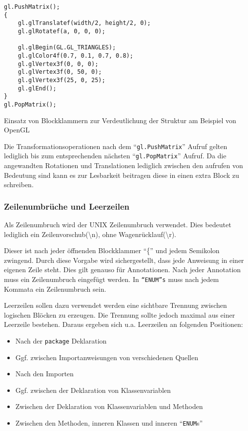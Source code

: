 \begin{listing}[H]
    \begin{verbatim}
gl.PushMatrix();
{
    gl.glTranslatef(width/2, height/2, 0); 
    gl.glRotatef(a, 0, 0, 0); 

    gl.glBegin(GL.GL_TRIANGLES); 
    gl.glColor4f(0.7, 0.1, 0.7, 0.8); 
    gl.glVertex3f(0, 0, 0); 
    gl.glVertex3f(0, 50, 0); 
    gl.glVertex3f(25, 0, 25); 
    gl.glEnd(); 
}
gl.PopMatrix();
    \end{verbatim}
    \caption{Einsatz von Blockklammern zur Verdeutlichung der Struktur am Beispiel von OpenGL}
    \label{own:blockopengl}
\end{listing}


Die Transformationsoperationen nach dem \enquote{\texttt{gl.PushMatrix}} Aufruf gelten lediglich bis zum entsprechenden nächsten \enquote{\texttt{gl.PopMatrix}} Aufruf. Da die angewandten Rotationen und Translationen lediglich zwischen den aufrufen von Bedeutung sind kann es zur Lesbarkeit beitragen diese in einen extra Block zu schreiben.

\subsubsection{Zeilenumbrüche und Leerzeilen}
Als Zeilenumbruch wird der UNIX Zeilenumbruch verwendet. Dies bedeutet lediglich ein Zeilenvorschub(\textbackslash n), ohne Wagenrücklauf(\textbackslash r).

Dieser ist nach jeder öffnenden Blockklammer \enquote{\{} und jedem Semikolon zwingend. Durch diese Vorgabe wird sichergestellt, dass jede Anweisung in einer eigenen Zeile steht. Dies gilt genauso für Annotationen. Nach jeder Annotation muss ein Zeilenumbruch eingefügt werden. In \texttt{\enquote{ENUM}s} muss nach jedem Kommata ein Zeilenumbruch sein.

Leerzeilen sollen dazu verwendet werden eine sichtbare Trennung zwischen logischen Blöcken zu erzeugen. Die Trennung sollte jedoch maximal aus einer Leerzeile bestehen. Daraus ergeben sich u.a. Leerzeilen an folgenden Positionen:

\begin{itemize}
\item Nach der \texttt{package} Deklaration
\item Ggf. zwischen Importanweisungen von verschiedenen Quellen
\item Nach den Importen
\item Ggf. zwischen der Deklaration von Klassenvariablen
\item Zwischen der Deklaration von Klassenvariablen und Methoden
\item Zwischen den Methoden, inneren Klassen und inneren \enquote{\texttt{ENUM}s}
\end{itemize}

